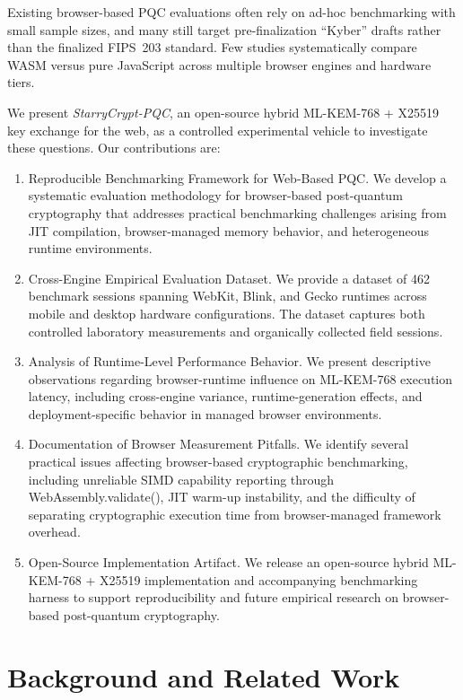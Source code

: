 \documentclass[11pt,a4paper]{article}
\def\textbf#1{#1}%
\def\texttt#1{#1}%
\begin{document}
Existing browser-based PQC evaluations often rely on ad-hoc benchmarking with small sample sizes, and many still target pre-finalization ``Kyber'' drafts rather than the finalized FIPS~203 standard. Few studies systematically compare WASM versus pure JavaScript across multiple browser engines and hardware tiers.

We present \textit{StarryCrypt-PQC}, an open-source hybrid ML-KEM-768 + X25519 key exchange for the web, as a controlled experimental vehicle to investigate these questions. Our contributions are:
\begin{enumerate}
    \item \textbf{Reproducible Benchmarking Framework for Web-Based PQC.} We develop a systematic evaluation methodology for browser-based post-quantum cryptography that addresses practical benchmarking challenges arising from JIT compilation, browser-managed memory behavior, and heterogeneous runtime environments.
    \item \textbf{Cross-Engine Empirical Evaluation Dataset.} We provide a dataset of 462 benchmark sessions spanning WebKit, Blink, and Gecko runtimes across mobile and desktop hardware configurations. The dataset captures both controlled laboratory measurements and organically collected field sessions.
    \item \textbf{Analysis of Runtime-Level Performance Behavior.} We present descriptive observations regarding browser-runtime influence on ML-KEM-768 execution latency, including cross-engine variance, runtime-generation effects, and deployment-specific behavior in managed browser environments.
    \item \textbf{Documentation of Browser Measurement Pitfalls.} We identify several practical issues affecting browser-based cryptographic benchmarking, including unreliable SIMD capability reporting through \texttt{WebAssembly.validate()}, JIT warm-up instability, and the difficulty of separating cryptographic execution time from browser-managed framework overhead.
    \item \textbf{Open-Source Implementation Artifact.} We release an open-source hybrid ML-KEM-768 + X25519 implementation and accompanying benchmarking harness to support reproducibility and future empirical research on browser-based post-quantum cryptography.
\end{enumerate}

\section{Background and Related Work}
\label{sec:background}
\end{document}
